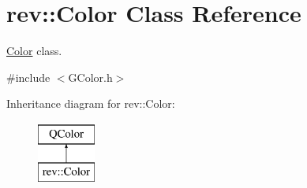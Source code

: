 \hypertarget{classrev_1_1_color}{}\section{rev\+::Color Class Reference}
\label{classrev_1_1_color}


\mbox{\hyperlink{classrev_1_1_color}{Color}} class.  




{\ttfamily \#include $<$G\+Color.\+h$>$}

Inheritance diagram for rev\+::Color\+:\begin{figure}[H]
\begin{center}
\leavevmode
\includegraphics[height=2.000000cm]{classrev_1_1_color}
\end{center}
\end{figure}
